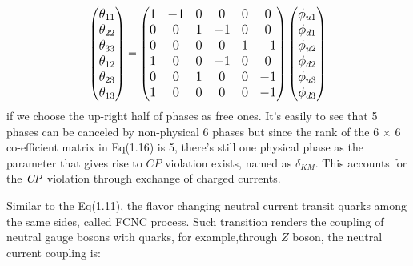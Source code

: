 \begin{equation}
\large
\begin{pmatrix}
\theta_{11}\\
\theta_{22}\\
\theta_{33}\\
\theta_{12}\\
\theta_{23}\\
\theta_{13}
\end{pmatrix}
=
\begin{pmatrix}
1&-1&0&0&0&0\\
0&0&1&-1&0&0\\
0&0&0&0&1&-1\\
1&0&0&-1&0&0\\
0&0&1&0&0&-1\\
1&0&0&0&0&-1
\end{pmatrix}
\begin{pmatrix}
\phi_{u1} \\
\phi_{d1} \\
\phi_{u2} \\
\phi_{d2} \\
\phi_{u3} \\
\phi_{d3} 
\end{pmatrix}
\end{equation}
if we choose the up-right half of phases as free ones. It's easily to see that 5 phases can be canceled by non-physical 6 phases but since the rank of the 6 $\times$ 6 co-efficient matrix in Eq(1.16) is 5, there's still one physical phase as the parameter that gives rise to $CP$ violation exists, named as $\delta_{KM}$. This accounts for the $\it{CP}$ violation through exchange of charged currents.

Similar to the Eq(1.11), the flavor changing neutral current transit quarks among the same sides, called FCNC process. Such transition renders the coupling of neutral gauge bosons with quarks, for example,through $Z$ boson,  the neutral current coupling is:

